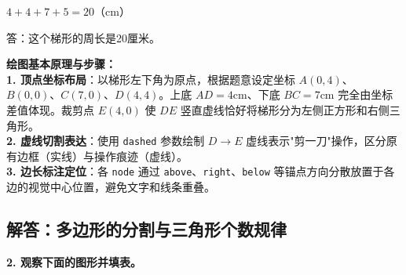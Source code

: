 \vspace{0.6cm}

\noindent
$4 + 4 + 7 + 5 = 20 \text{（cm）}$

\vspace{0.4cm}

\noindent
答：这个梯形的周长是20厘米。

\vspace{0.6cm}

{\small\color{blue!70!black}
\textbf{绘图基本原理与步骤：}\\
\textbf{1. 顶点坐标布局}：以梯形左下角为原点，根据题意设定坐标 $A(0,4)$、$B(0,0)、C(7,0)、D(4,4)$。上底 $AD=4$cm、下底 $BC=7$cm 完全由坐标差值体现。裁剪点 $E(4,0)$ 使 $DE$ 竖直虚线恰好将梯形分为左侧正方形和右侧三角形。\\
\textbf{2. 虚线切割表达}：使用 \texttt{dashed} 参数绘制 $D \to E$ 虚线表示"剪一刀"操作，区分原有边框（实线）与操作痕迹（虚线）。\\
\textbf{3. 边长标注定位}：各 \texttt{node} 通过 \texttt{above}、\texttt{right}、\texttt{below} 等锚点方向分散放置于各边的视觉中心位置，避免文字和线条重叠。
}



\newpage

\newpage

\subsection{解答：多边形的分割与三角形个数规律}

\vspace{0.4cm}

\noindent\textbf{2. 观察下面的图形并填表。}

\vspace{0.8cm}

%
%

